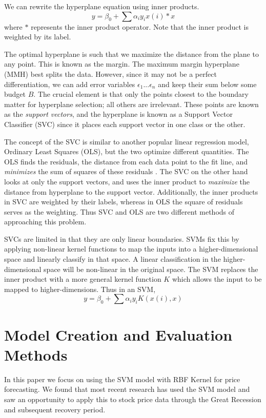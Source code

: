 \documentclass[pageno]{jpaper}
\begin{document}
We can rewrite the hyperplane equation using inner products.
$$y = \beta_0 + \sum \alpha_iy_ix(i)*x$$
where $*$ represents the inner product operator. Note that the inner product is weighted by its label. 

The optimal hyperplane is such that we maximize the distance from the plane to any point. This is known as the margin. The maximum margin hyperplane (MMH) best splits the data. However, since it may not be a perfect differentiation, we can add error variables $\epsilon_1 ... \epsilon_n$ and keep their sum below some budget $B$. The crucial element is that only the points closest to the boundary matter for hyperplane selection; all others are irrelevant. These points are known as the {\em support vectors}, and the hyperplane is known as a Support Vector Classifier (SVC) since it places each support vector in one class or the other.

The concept of the SVC is similar to another popular linear regression model, Ordinary Least Squares (OLS), but the two optimize different quantities. The OLS finds the residuals, the distance from each data point to the fit line, and {\em minimizes} the sum of squares of these residuals \cite{watson}. The SVC on the other hand looks at only the support vectors, and uses the inner product to {\em maximize} the distance from hyperplane to the support vector. Additionally, the inner products in SVC are weighted by their labels, whereas in OLS the square of residuals serves as the weighting. Thus SVC and OLS are two different methods of approaching this problem.

SVCs are limited in that they are only linear boundaries. SVMs fix this by applying non-linear kernel functions to map the inputs into a higher-dimensional space and linearly classify in that space. A linear classification in the higher-dimensional space will be non-linear in the original space. The SVM replaces the inner product with a more general kernel function $K$ which allows the input to be mapped to higher-dimensions. Thus in an SVM,
$$y = \beta_0 + \sum \alpha_i y_i K(x(i),x)$$

\section{Model Creation and Evaluation Methods}
In this paper we focus on using the SVM model with RBF Kernel for price forecasting. We found that most recent research has used the SVM model and saw an opportunity to apply this to stock price data through the Great Recession and subsequent recovery period. 
\end{document}
